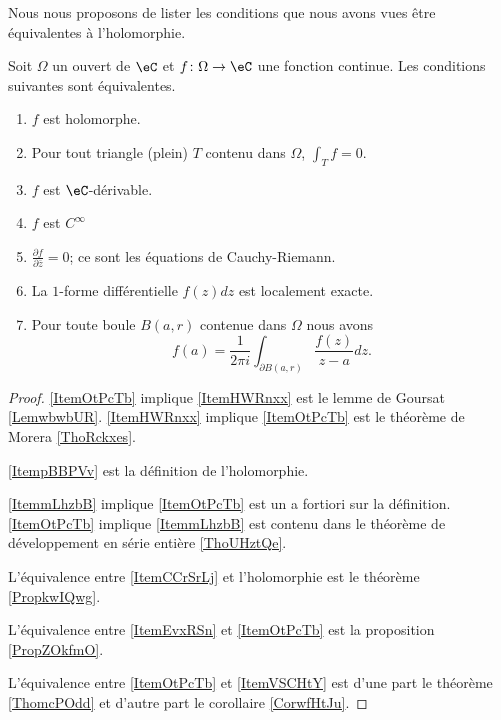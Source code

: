 Nous nous proposons de lister les conditions que nous avons vues être équivalentes à l'holomorphie.

\begin{theorem}
    Soit \( \Omega\) un ouvert de \( \eC\) et \( f\colon \Omega\to \eC\) une fonction continue. Les conditions suivantes sont équivalentes.
    \begin{enumerate}
        \item   \label{ItemOtPcTb}
            \( f\) est holomorphe.
        \item   \label{ItemHWRnxx}
            Pour tout triangle (plein) \( T\) contenu dans \( \Omega\), \( \int_Tf=0\).
        \item   \label{ItempBBPVv}
            \( f\) est \( \eC\)-dérivable.
        \item   \label{ItemmLhzbB}
            \( f\) est \(  C^{\infty}\)
        \item   \label{ItemCCrSrLj}
            \( \frac{ \partial f }{ \partial \bar z }=0\); ce sont les équations de Cauchy-Riemann.
        \item   \label{ItemEvxRSn}
            La \( 1\)-forme différentielle \( f(z)dz\) est localement exacte.
        \item   \label{ItemVSCHtY}
            Pour toute boule \( B(a,r)\) contenue dans \( \Omega\) nous avons
            \begin{equation}
                f(a)=\frac{1}{ 2\pi i }\int_{\partial B(a,r)}\frac{ f(z) }{ z-a }dz.
            \end{equation}
    \end{enumerate}
\end{theorem}

\begin{proof}
    \ref{ItemOtPcTb} implique \ref{ItemHWRnxx} est le lemme de Goursat \ref{LemwbwbUR}. \ref{ItemHWRnxx} implique \ref{ItemOtPcTb} est le théorème de Morera \ref{ThoRckxes}.

    \ref{ItempBBPVv} est la définition de l'holomorphie.

    \ref{ItemmLhzbB} implique \ref{ItemOtPcTb} est un a fortiori sur la définition. \ref{ItemOtPcTb} implique \ref{ItemmLhzbB} est contenu dans le théorème de développement en série entière \ref{ThoUHztQe}.

    L'équivalence entre \ref{ItemCCrSrLj} et l'holomorphie est le théorème \ref{PropkwIQwg}.

    L'équivalence entre \ref{ItemEvxRSn} et \ref{ItemOtPcTb} est la proposition \ref{PropZOkfmO}.

    L'équivalence entre \ref{ItemOtPcTb} et \ref{ItemVSCHtY} est d'une part le théorème \ref{ThomcPOdd} et d'autre part le corollaire \ref{CorwfHtJu}.
\end{proof}
